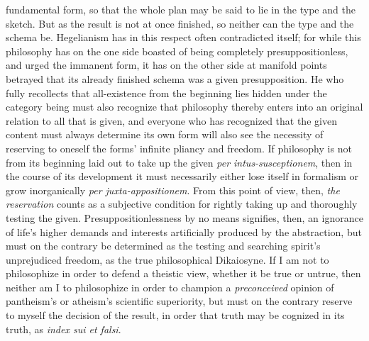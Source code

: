 \documentclass[12pt]{book}
\begin{document}
fundamental form, so that the whole plan may be said to lie in the type and
the sketch. But as the result is not at once finished, so neither can the
type and the schema be. Hegelianism has in this respect often contradicted
itself; for while this philosophy has on the one side boasted of being
completely presuppositionless, and urged the immanent form, it has on the
other side at manifold points betrayed that its already finished schema was
a given presupposition. He who fully recollects that all-existence from the
beginning lies hidden under the category being must also recognize that
philosophy thereby enters into an original relation to all that is given,
and everyone who has recognized that the given content must always determine
its own form will also see the necessity of reserving to oneself the forms'
infinite pliancy and freedom. If philosophy is not from its beginning laid
out to take up the given \textit{per intus-susceptionem}, then in the course
of its development it must necessarily either lose itself in formalism or
grow inorganically \textit{per juxta-appositionem}. From this point of view,
then, \emph{the reservation} counts as a subjective condition for rightly
taking up and thoroughly testing the given. Presuppositionlessness by no
means signifies, then, an ignorance of life's higher demands and interests
artificially produced by the abstraction, but must on the contrary be
determined as the testing and searching spirit's unprejudiced freedom, as
the true philosophical Dikaiosyne. If I am not to philosophize in order to
defend a theistic view, whether it be true or untrue, then neither am I to
philosophize in order to champion a \emph{preconceived} opinion of
pantheism's or atheism's scientific superiority, but must on the contrary
reserve to myself the decision of the result, in order that truth may be
cognized in its truth, as \textit{index sui et falsi}.
\end{document}
